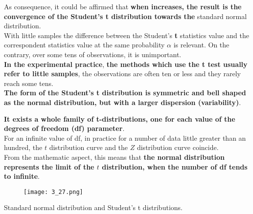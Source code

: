 \begin{frame}
  \vspace*{.25cm}
  As consequence, it could be affirmed that \textbf{when  increases, the result is the convergence of the Student's \textbf{t} distribution towards the } standard normal distribution.\\
  \vspace*{.25cm}
  With little samples the difference between the Student's \textbf{t} statistics value and the correspondent  statistics value at the same probability {\boldmath $ \alpha $} is relevant. On the contrary, over some tens of observations, it is unimportant.\\
  \vspace*{.25cm}
  \textbf{In the experimental practice}, \textbf{the methods which use the t test usually refer to little samples}, the observations are often ten or less and they rarely reach some tens.\\
  \vspace*{.25cm}
  \textbf{The form of the Student's t distribution is symmetric and bell shaped as the normal distribution, but with a larger dispersion (variability)}.
\end{frame}

\begin{frame}
  \vspace*{.5cm}
  \textbf{It exists a whole family of t-distributions, one for each value of the degrees of freedom (df) parameter}.\\
  \vspace*{.5cm}
  For an infinite value of df, in practice for a number of data little greater than an hundred, the {\boldmath $ t $} distribution curve and the {\boldmath $ Z $} distribution curve coincide.\\
  \vspace*{.5cm}
  From the mathematic aspect, this means that \textbf{the normal distribution represents the limit of the {\boldmath $ t $} distribution, when the number of df tends to infinite}.
\end{frame}

\begin{frame}
  \begin{figure}
    \texttt{[image: 3\_27.png]}
  \end{figure}
  \hspace*{1cm}Standard normal distribution and Student's t distributions.
\end{frame}

